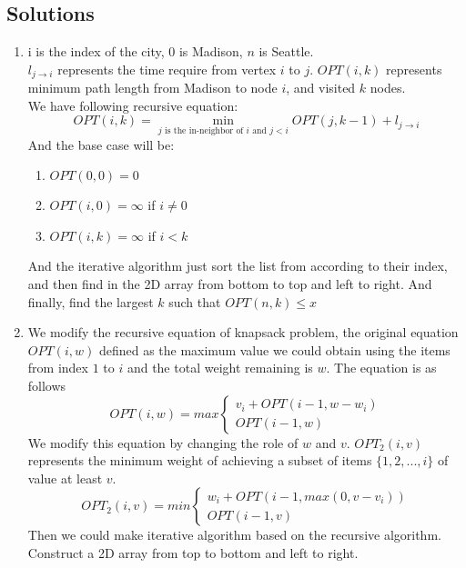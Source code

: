 \documentclass{article}
\begin{document}

\noindent
{}

\subsection*{Solutions}

\begin{enumerate}
\item i is the index of the city, $0$ is Madison, $n$ is Seattle.\\
$l_{j \rightarrow i}$ represents the time require from vertex $i$ to $j$.
$OPT(i,k)$ represents minimum path length from Madison to node $i$, and visited $k$ nodes.\\
We have following recursive equation:
\begin{equation}
OPT(i,k) = \min_{j \text{ is the in-neighbor of } i \text{ and } j<i} OPT(j,k-1) + l_{j \rightarrow i}
\end{equation}
And the base case will be:
\begin{enumerate}
\item $OPT(0,0) = 0$
\item $OPT(i,0) = \infty$ if $i \neq 0$
\item $OPT(i,k) = \infty$ if $i<k$
\end{enumerate}
And the iterative algorithm just sort the list from according to their index, and then find in the 2D array from bottom to top and left to right. And finally, find the largest $k$ such that $OPT(n,k) \leqslant x$ \\

\item
We modify the recursive equation of knapsack problem, the original equation $OPT(i,w)$ defined as the maximum value we could obtain using the items from index $1$ to $i$ and the total weight remaining is $w$. The equation is as follows
\begin{equation}
OPT(i, w) = max
\begin {cases}
v_i + OPT(i-1, w - w_i) \\
OPT(i-1, w)
\end{cases}
\end{equation}
We modify this equation by changing the role of $w$ and $v$. $OPT_2(i, v)$ represents the minimum weight of achieving a subset of items $\{1,2,...,i\}$ of value at least $v$.
\begin{equation}
OPT_2(i, v) = min
\begin {cases}
w_i + OPT(i-1, max(0, v - v_i)) \\
OPT(i-1, v)
\end{cases}
\end{equation}
Then we could make iterative algorithm based on the recursive algorithm. Construct a 2D array from top to bottom and left to right. 


\end{enumerate}
\end{document}
